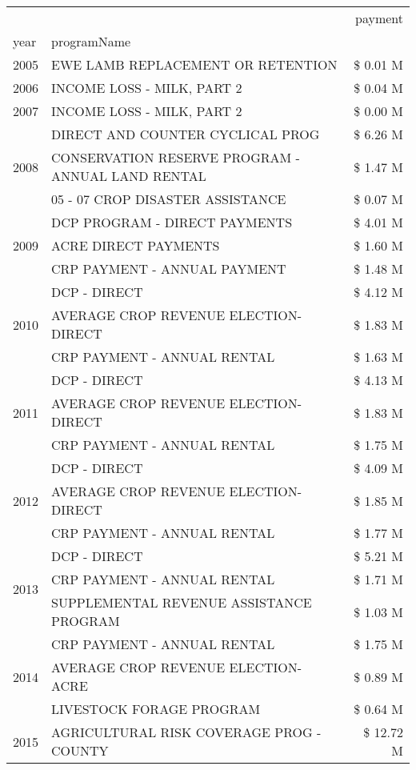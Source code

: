 \begin{tabular}{llr}
\toprule
 &  & payment \\
year & programName &  \\
\midrule
2005 & EWE LAMB REPLACEMENT OR RETENTION & \$ 0.01 M \\
\cline{1-3}
2006 & INCOME LOSS - MILK, PART 2 & \$ 0.04 M \\
\cline{1-3}
2007 & INCOME LOSS - MILK, PART 2 & \$ 0.00 M \\
\cline{1-3}
\multirow[t]{3}{*}{2008} & DIRECT AND COUNTER CYCLICAL PROG & \$ 6.26 M \\
 & CONSERVATION RESERVE PROGRAM - ANNUAL LAND RENTAL & \$ 1.47 M \\
 & 05 - 07 CROP DISASTER ASSISTANCE & \$ 0.07 M \\
\cline{1-3}
\multirow[t]{3}{*}{2009} & DCP PROGRAM - DIRECT PAYMENTS & \$ 4.01 M \\
 & ACRE DIRECT PAYMENTS & \$ 1.60 M \\
 & CRP PAYMENT - ANNUAL PAYMENT & \$ 1.48 M \\
\cline{1-3}
\multirow[t]{3}{*}{2010} & DCP - DIRECT & \$ 4.12 M \\
 & AVERAGE CROP REVENUE ELECTION-DIRECT & \$ 1.83 M \\
 & CRP PAYMENT - ANNUAL RENTAL & \$ 1.63 M \\
\cline{1-3}
\multirow[t]{3}{*}{2011} & DCP - DIRECT & \$ 4.13 M \\
 & AVERAGE CROP REVENUE ELECTION-DIRECT & \$ 1.83 M \\
 & CRP PAYMENT - ANNUAL RENTAL & \$ 1.75 M \\
\cline{1-3}
\multirow[t]{3}{*}{2012} & DCP - DIRECT & \$ 4.09 M \\
 & AVERAGE CROP REVENUE ELECTION-DIRECT & \$ 1.85 M \\
 & CRP PAYMENT - ANNUAL RENTAL & \$ 1.77 M \\
\cline{1-3}
\multirow[t]{3}{*}{2013} & DCP - DIRECT & \$ 5.21 M \\
 & CRP PAYMENT - ANNUAL RENTAL & \$ 1.71 M \\
 & SUPPLEMENTAL REVENUE ASSISTANCE PROGRAM & \$ 1.03 M \\
\cline{1-3}
\multirow[t]{3}{*}{2014} & CRP PAYMENT - ANNUAL RENTAL & \$ 1.75 M \\
 & AVERAGE CROP REVENUE ELECTION-ACRE & \$ 0.89 M \\
 & LIVESTOCK FORAGE PROGRAM & \$ 0.64 M \\
\cline{1-3}
\multirow[t]{3}{*}{2015} & AGRICULTURAL RISK COVERAGE PROG - COUNTY & \$ 12.72 M \\

\end{tabular}
